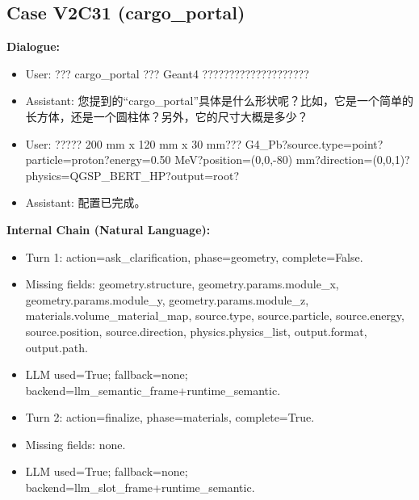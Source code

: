 \documentclass[11pt]{ctexart}
\begin{document}
\subsection{Case V2C31 (cargo\_portal)}
\textbf{Dialogue:}
\begin{itemize}
\item User: ??? cargo\_portal ??? Geant4 ????????????????????
\item Assistant: 您提到的“cargo\_portal”具体是什么形状呢？比如，它是一个简单的长方体，还是一个圆柱体？另外，它的尺寸大概是多少？
\item User: ????? 200 mm x 120 mm x 30 mm??? G4\_Pb?source.type=point?particle=proton?energy=0.50 MeV?position=(0,0,-80) mm?direction=(0,0,1)?physics=QGSP\_BERT\_HP?output=root?
\item Assistant: 配置已完成。
\end{itemize}
\textbf{Internal Chain (Natural Language):}
\begin{itemize}
\item Turn 1: action=ask\_clarification, phase=geometry, complete=False.
\item Missing fields: geometry.structure, geometry.params.module\_x, geometry.params.module\_y, geometry.params.module\_z, materials.volume\_material\_map, source.type, source.particle, source.energy, source.position, source.direction, physics.physics\_list, output.format, output.path.
\item LLM used=True; fallback=none; backend=llm\_semantic\_frame+runtime\_semantic.
\item Turn 2: action=finalize, phase=materials, complete=True.
\item Missing fields: none.
\item LLM used=True; fallback=none; backend=llm\_slot\_frame+runtime\_semantic.
\end{itemize}
\end{document}
